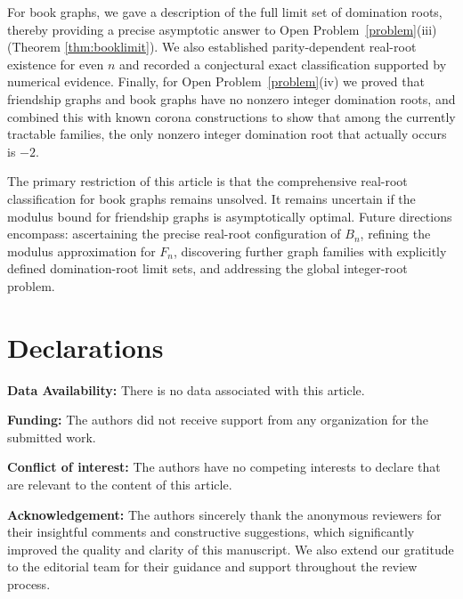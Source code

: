\documentclass[12pt]{article}
\theoremstyle{definition}
\begin{document}
	For book graphs, we gave a description of the full limit set of domination roots, thereby providing a precise asymptotic answer to  Open Problem~\ref{problem}(iii) (Theorem \ref{thm:booklimit}). We also established parity-dependent real-root existence for even $n$ and recorded a conjectural exact classification supported by numerical evidence. Finally, for  Open Problem~\ref{problem}(iv) we proved that friendship graphs and book graphs have no nonzero integer domination roots, and combined this with known corona constructions to show that among the currently tractable families, the only nonzero integer domination root that actually occurs is $-2$.
	
	The primary restriction of this article is that the comprehensive real-root classification for book graphs remains unsolved. It remains uncertain if the modulus bound for friendship graphs is asymptotically optimal. Future directions encompass: ascertaining the precise real-root configuration of $B_n$, refining the modulus approximation for $F_n$, discovering further graph families with explicitly defined domination-root limit sets, and addressing the global integer-root problem.
	
	\section*{Declarations}
	\noindent \textbf{Data Availability:}	There is no data associated with this article.
	
	\noindent \textbf{Funding:} The authors did not receive support from any organization for the submitted work.
	
	\noindent \textbf{Conflict of interest:} The authors have no competing interests to declare that are relevant to the content of this article.
	
	\noindent\textbf{Acknowledgement:} The authors sincerely thank the anonymous reviewers for their insightful comments and constructive suggestions, which significantly improved the quality and clarity of this manuscript. We also extend our gratitude to the editorial team for their guidance and support throughout the review process.
	
\end{document}
